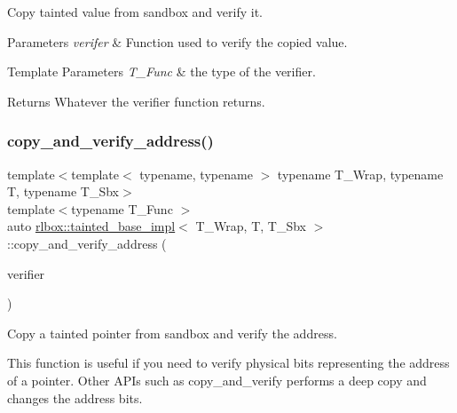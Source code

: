 Copy tainted value from sandbox and verify it. 


\begin{DoxyParams}{Parameters}
{\em verifer} & Function used to verify the copied value. \\
\hline
\end{DoxyParams}

\begin{DoxyTemplParams}{Template Parameters}
{\em T\+\_\+\+Func} & the type of the verifier. \\
\hline
\end{DoxyTemplParams}
\begin{DoxyReturn}{Returns}
Whatever the verifier function returns. 
\end{DoxyReturn}
\mbox{\label{classrlbox_1_1tainted__base__impl_ad34419b3444d0bf37e25ecf7d37fbe0b}} 
\subsubsection{\texorpdfstring{copy\+\_\+and\+\_\+verify\+\_\+address()}{copy\_and\_verify\_address()}}
{\footnotesize\ttfamily template$<$template$<$ typename, typename $>$ typename T\+\_\+\+Wrap, typename T, typename T\+\_\+\+Sbx$>$ \\
template$<$typename T\+\_\+\+Func $>$ \\
auto \hyperlink{classrlbox_1_1tainted__base__impl}{rlbox\+::tainted\+\_\+base\+\_\+impl}$<$ T\+\_\+\+Wrap, T, T\+\_\+\+Sbx $>$\+::copy\+\_\+and\+\_\+verify\+\_\+address (\begin{DoxyParamCaption}\item[{T\+\_\+\+Func}]{verifier }\end{DoxyParamCaption})\hspace{0.3cm}{\ttfamily [inline]}}



Copy a tainted pointer from sandbox and verify the address. 

This function is useful if you need to verify physical bits representing the address of a pointer. Other A\+P\+Is such as copy\+\_\+and\+\_\+verify performs a deep copy and changes the address bits.


